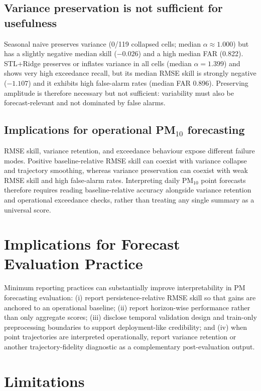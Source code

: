 \documentclass[3p,times,single-column]{elsarticle}
\begin{document}
\subsection{Variance preservation is not sufficient for usefulness}
Seasonal naive preserves variance (0/119 collapsed cells; median $\alpha \approx 1.000$) but has a slightly negative median skill ($-0.026$) and a high median FAR (0.822). STL+Ridge preserves or inflates variance in all cells (median $\alpha = 1.399$) and shows very high exceedance recall, but its median RMSE skill is strongly negative ($-1.107$) and it exhibits high false-alarm rates (median FAR 0.896). Preserving amplitude is therefore necessary but not sufficient: variability must also be forecast-relevant and not dominated by false alarms.

\subsection{Implications for operational PM$_{10}$ forecasting}
RMSE skill, variance retention, and exceedance behaviour expose different failure modes. Positive baseline-relative RMSE skill can coexist with variance collapse and trajectory smoothing, whereas variance preservation can coexist with weak RMSE skill and high false-alarm rates. Interpreting daily PM$_{10}$ point forecasts therefore requires reading baseline-relative accuracy alongside variance retention and operational exceedance checks, rather than treating any single summary as a universal score.

\section{Implications for Forecast Evaluation Practice}
Minimum reporting practices can substantially improve interpretability in PM forecasting evaluation: (i) report persistence-relative RMSE skill so that gains are anchored to an operational baseline; (ii) report horizon-wise performance rather than only aggregate scores; (iii) disclose temporal validation design and train-only preprocessing boundaries to support deployment-like credibility; and (iv) when point trajectories are interpreted operationally, report variance retention or another trajectory-fidelity diagnostic as a complementary post-evaluation output.

\section{Limitations}
\end{document}
